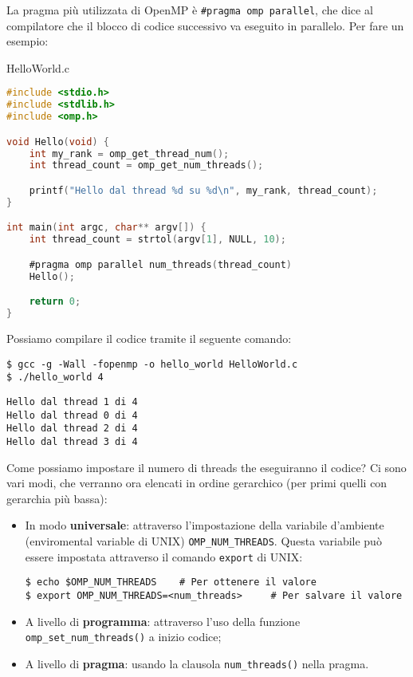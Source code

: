 La pragma più utilizzata di OpenMP è \verb|#pragma omp parallel|, che dice al compilatore che il blocco di codice successivo va eseguito in parallelo. Per fare un esempio:

\begin{codeblock}{HelloWorld.c}
    \begin{lstlisting}[language = C]
#include <stdio.h>
#include <stdlib.h>
#include <omp.h>

void Hello(void) {
    int my_rank = omp_get_thread_num();
    int thread_count = omp_get_num_threads();

    printf("Hello dal thread %d su %d\n", my_rank, thread_count);
}

int main(int argc, char** argv[]) {
    int thread_count = strtol(argv[1], NULL, 10);

    #pragma omp parallel num_threads(thread_count)
    Hello();

    return 0;
}\end{lstlisting}
\end{codeblock}

Possiamo compilare il codice tramite il seguente comando:

\begin{terminal}
    \begin{lstlisting}[style = notexterm]
$ gcc -g -Wall -fopenmp -o hello_world HelloWorld.c
$ ./hello_world 4
    \end{lstlisting}
    \begin{tcolorbox}
        \begin{lstlisting}[basewidth=0.44em, numbers=none]
Hello dal thread 1 di 4
Hello dal thread 0 di 4
Hello dal thread 2 di 4
Hello dal thread 3 di 4\end{lstlisting}
    \end{tcolorbox}
\end{terminal}

Come possiamo impostare il numero di threads the eseguiranno il codice? Ci sono vari modi, che verranno ora elencati in ordine gerarchico (per primi quelli con gerarchia più bassa):
\begin{itemize}
    \item In modo \textbf{universale}: attraverso l'impostazione della variabile d'ambiente (enviromental variable di UNIX) \verb|OMP_NUM_THREADS|. Questa variabile può essere impostata attraverso il comando \verb|export| di UNIX:
    \begin{terminal}
        \begin{lstlisting}[style = notexterm]
$ echo $OMP_NUM_THREADS    # Per ottenere il valore
$ export OMP_NUM_THREADS=<num_threads>     # Per salvare il valore\end{lstlisting}
    \end{terminal}

    \item A livello di \textbf{programma}: attraverso l'uso della funzione \verb|omp_set_num_threads()| a inizio codice;
    \item A livello di \textbf{pragma}: usando la clausola \verb|num_threads()| nella pragma.
\end{itemize}

